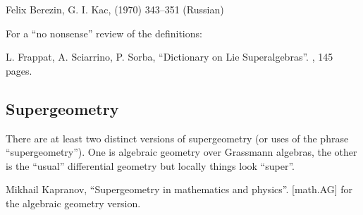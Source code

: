 \begin{enumerate}[resume,label={[\arabic*]}]
\item Felix Berezin, G. I. Kac,   (1970) 343--351 (Russian)
\end{enumerate}
For a ``no nonsense'' review of the definitions:
\begin{enumerate}[resume,label={[\arabic*]}]
\item L. Frappat, A. Sciarrino, P. Sorba,
  ``Dictionary on Lie Superalgebras''.\newline
  , 145 pages.
\end{enumerate}

\subsection{Supergeometry}

There are at least two distinct versions of supergeometry (or uses of
the phrase ``supergeometry''). One is algebraic geometry over Grassmann
algebras, the other is the ``usual'' differential geometry but locally
things look ``super''.

\begin{enumerate}[resume,label={[\arabic*]}]
\item Mikhail Kapranov, ``Supergeometry in mathematics and physics''.\newline
{} [math.AG] for the algebraic geometry version.
\end{enumerate}

